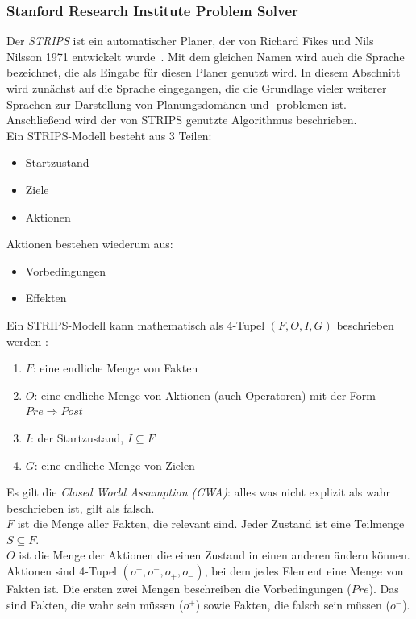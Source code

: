 \subsubsection{Stanford Research Institute Problem Solver}{\label{chap:strips}}
Der \emph{\ac{STRIPS}} ist ein automatischer Planer, der von Richard Fikes und Nils Nilsson 1971 entwickelt wurde~\cite{FIKES1971189}.
Mit dem gleichen Namen wird auch die Sprache bezeichnet, die als Eingabe für diesen Planer genutzt wird.
In diesem Abschnitt wird zunächst auf die Sprache eingegangen, die die Grundlage vieler weiterer Sprachen zur Darstellung von Planungsdomänen und -problemen ist.
Anschließend wird der von \ac{STRIPS} genutzte Algorithmus beschrieben.\\
Ein \ac{STRIPS}-Modell besteht aus 3 Teilen:
\begin{itemize}
    \item Startzustand
    \item Ziele
    \item Aktionen
\end{itemize}
Aktionen bestehen wiederum aus:
\begin{itemize}
    \item Vorbedingungen
    \item Effekten
\end{itemize}
Ein \ac{STRIPS}-Modell kann mathematisch als 4-Tupel \((F,O,I,G)\) beschrieben werden \cite{stripsdef}:
\begin{enumerate}
    \item \(F\): eine endliche Menge von Fakten
    \item \(O\): eine endliche Menge von Aktionen (auch Operatoren) mit der Form $Pre \Rightarrow Post$
    \item \(I\): der Startzustand, $I\subseteq F$
    \item \(G\): eine endliche Menge von Zielen
\end{enumerate}
Es gilt die \emph{Closed World Assumption (CWA)}: alles was nicht explizit als wahr beschrieben ist, gilt als falsch.\\
$F$ ist die Menge aller Fakten, die relevant sind.
Jeder Zustand ist eine Teilmenge $S\subseteq F$.\\
$O$ ist die Menge der Aktionen die einen Zustand in einen anderen ändern können.
Aktionen sind 4-Tupel \((o^+,o^-,o_+,o_-)\), bei dem jedes Element eine Menge von Fakten ist.
Die ersten zwei Mengen beschreiben die Vorbedingungen ($Pre$).
Das sind Fakten, die wahr sein müssen ($o^+$) sowie Fakten, die falsch sein müssen ($o^-$).
